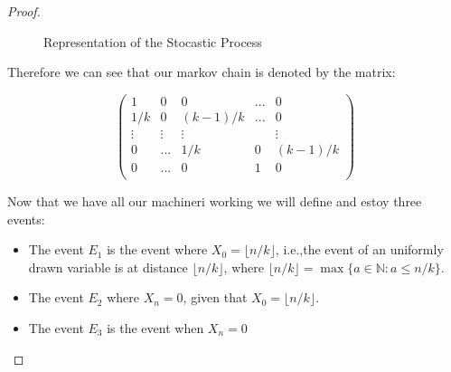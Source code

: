 \begin{proof}
\begin{figure}[H]
  \centering
  
  
  \caption{Representation of the Stocastic Process}
\end{figure}


Therefore we can see that our markov chain is denoted by the matrix:

$$
\begin{pmatrix}
  1 & 0 & 0& ... & 0\\
  1/k & 0 & (k-1)/k & ... & 0\\
  \vdots & \vdots & \vdots & & \vdots\\
  0 & ... & 1/k & 0 & (k-1)/k\\
  0 & ... & 0 & 1 & 0\\
\end{pmatrix}
$$

Now that we have all our machineri working we will define and estoy three events:

\begin{itemize}
\item The event $E_1$ is the event where $X_0 = \lfloor n/k\rfloor$, i.e.,the event of an uniformly drawn variable is at distance $\lfloor n/k\rfloor$, where $\lfloor n/k\rfloor = \max\{a \in \mathbb{N}: a \le n/k \}$. 
\item The event $E_2$ where $X_n = 0$, given that $X_0= \lfloor n/k\rfloor$.

\item The event $E_3$ is the event when $X_n = 0$
\end{itemize}



\end{proof}
